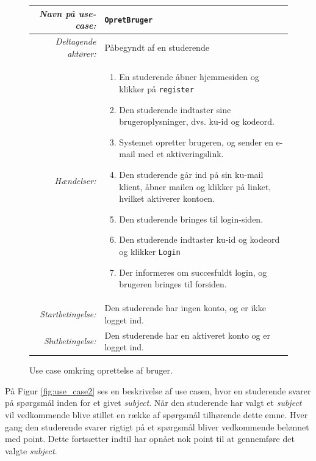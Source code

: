 \documentclass[11pt, a4paper]{article}
\begin{document}
\begin{figure}[h]
    \centering
    \begin{tabular}{r p{8cm}}
        \toprule
        \textit{Navn på use-case:} & \verb!OpretBruger! \\
        \hline
        \textit{Deltagende aktører:} & Påbegyndt af en studerende \\
        \hline
        \textit{Hændelser:} & \begin{enumerate}[nolistsep]
            \item En studerende åbner hjemmesiden og klikker på \verb!register!
            \item Den studerende indtaster sine brugeroplysninger, dvs. ku-id og kodeord.
            \item Systemet opretter brugeren, og sender en e-mail med et aktiveringslink.
            \item Den studerende går ind på sin ku-mail klient, åbner mailen og klikker på linket, hvilket aktiverer kontoen.
            \item Den studerende bringes til login-siden.
            \item Den studerende indtaster ku-id og kodeord og klikker \verb!Login!
            \item Der informeres om succesfuldt login, og brugeren bringes til forsiden.
        \end{enumerate}  \\
        \hline
        \textit{Startbetingelse:} & Den studerende har ingen konto, og er ikke logget ind. \\
        \hline
        \textit{Slutbetingelse:} & Den studerende har en aktiveret konto og er logget ind. \\
        \bottomrule
    \end{tabular}
    \caption{Use case omkring oprettelse af bruger.}
    \label{fig:use_case1}
\end{figure}

På Figur \ref{fig:use_case2} ses en beskrivelse af use casen, hvor en studerende svarer på spørgsmål inden for et givet \emph{subject}. Når den studerende har valgt et \emph{subject} vil vedkommende blive stillet en række af spørgsmål tilhørende dette emne. Hver gang den studerende svarer rigtigt på et spørgsmål bliver vedkommende belønnet med point. Dette fortsætter indtil har opnået nok point til at gennemføre det valgte \emph{subject}.
\end{document}
